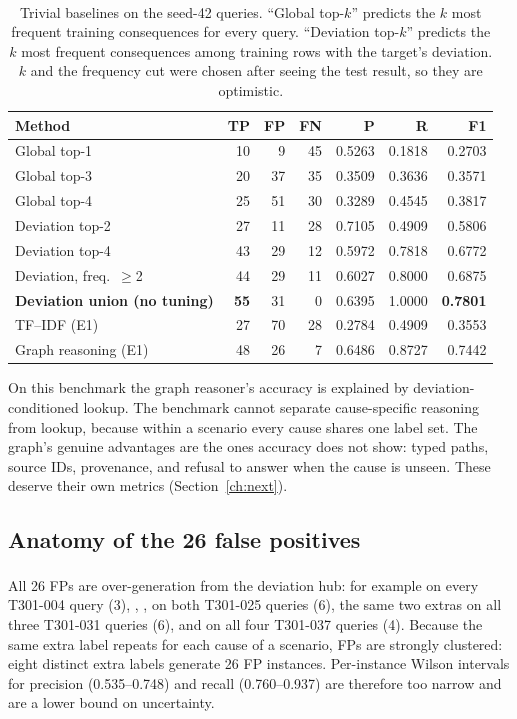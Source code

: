 \documentclass[10pt,twocolumn,a4paper]{extarticle}
\newcommand{\derived}{\textsuperscript{\textdagger}}
\begin{document}
\begin{table}[t]
\centering
\caption{Trivial baselines\derived{} on the seed-42 queries. ``Global top-$k$'' predicts the $k$ most frequent training consequences for every query. ``Deviation top-$k$'' predicts the $k$ most frequent consequences among training rows with the target's deviation. $k$ and the frequency cut were chosen after seeing the test result, so they are optimistic.}
\label{tab:triv}
\begin{tabular}{@{}l r r r rrr@{}}
\toprule
\textbf{Method} & \textbf{TP} & \textbf{FP} & \textbf{FN} & \textbf{P} & \textbf{R} & \textbf{F1}\\
\midrule
Global top-1 & 10 & 9 & 45 & 0.5263 & 0.1818 & 0.2703\\
Global top-3 & 20 & 37 & 35 & 0.3509 & 0.3636 & 0.3571\\
Global top-4 & 25 & 51 & 30 & 0.3289 & 0.4545 & 0.3817\\
Deviation top-2 & 27 & 11 & 28 & 0.7105 & 0.4909 & 0.5806\\
Deviation top-4 & 43 & 29 & 12 & 0.5972 & 0.7818 & 0.6772\\
Deviation, freq.\ $\ge$2 & 44 & 29 & 11 & 0.6027 & 0.8000 & 0.6875\\
\textbf{Deviation union (no tuning)} & \textbf{55} & 31 & 0 & 0.6395 & 1.0000 & \textbf{0.7801}\\
\midrule
TF--IDF (E1) & 27 & 70 & 28 & 0.2784 & 0.4909 & 0.3553\\
Graph reasoning (E1) & 48 & 26 & 7 & 0.6486 & 0.8727 & 0.7442\\
\bottomrule
\end{tabular}
\end{table}

\begin{finding}[Interpretation]
On this benchmark the graph reasoner's accuracy is explained by deviation-conditioned lookup. The benchmark cannot separate cause-specific reasoning from lookup, because within a scenario every cause shares one label set. The graph's genuine advantages are the ones accuracy does not show: typed paths, source IDs, provenance, and refusal to answer when the cause is unseen. These deserve their own metrics (Section~\ref{ch:next}).
\end{finding}

\subsection{Anatomy of the 26 false positives}\label{sec:fp}
All 26 FPs\derived{} are over-generation from the deviation hub: for example  on every T301-004 query (3), , ,  on both T301-025 queries (6), the same two extras on all three T301-031 queries (6), and  on all four T301-037 queries (4). Because the same extra label repeats for each cause of a scenario, FPs are strongly clustered: eight distinct extra labels generate 26 FP instances. Per-instance Wilson intervals for precision (0.535--0.748) and recall (0.760--0.937) are therefore too narrow and are a lower bound on uncertainty.
\end{document}
